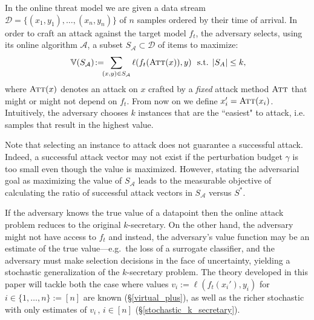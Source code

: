 In the online threat model we are given a data stream $\mathcal{D}=\{(x_1,y_1),\ldots,(x_n,y_n)\}$ of $n$ samples ordered by their time of arrival. In order to craft an attack against the target model $f_t$, the adversary selects, using its online algorithm $\mathcal{A}$, a subset $S_{\mathcal{A}} \subset \mathcal{D}$ of items to maximize: %
\begin{equation}\label{eq:asp}
   \mathbb{V}(S_\mathcal{A}) \! := \!\!\! \sum_{ (x,y) \in S_\mathcal{A}} \ell(f_{t}(\textsc{Att}(x)),y) \ \text{ s.t. } 
   |S_A| \leq k,\hspace{-1mm} 
\end{equation}
where $\textsc{Att}(x)$ denotes an attack on $x$ crafted by a \emph{fixed} attack method $\textsc{Att}$ that might or might not depend on $f_t$. From now on we define $x_i'=\textsc{Att}(x_i)$. 
Intuitively, the adversary chooses $k$ instances that are the ``easiest" to attack, i.e. samples that result in the highest value. 

Note that selecting an instance to attack does not guarantee a successful attack.
Indeed, a successful attack vector may not exist if the perturbation budget $\gamma$ is too small even though the value is maximized. However, stating the adversarial goal as maximizing the value of $S_{\mathcal{A}}$ leads to the measurable objective of calculating the ratio of successful attack vectors in $S_{\mathcal{A}}$ versus $S^*$.

If the adversary knows the true value of a datapoint then the online attack problem reduces to the original $k$-secretary. On the other hand, the adversary might not have access to $f_t$ and instead, the adversary's value function may be an estimate of the true value---e.g.\ the loss of a surrogate classifier, and the adversary must make selection decisions in the face of uncertainty, yielding a stochastic generalization of the $k$-secretary problem. The theory developed in this paper will tackle both the case where values $v_i:=\ell(f_t(x_i'),y_i)$ for $i \in \{1,\ldots,n\} :=[n]$ are known (\S\ref{virtual_plus}), as well as the richer stochastic with only estimates of $v_i\,,\, i \in [n]$ (\S\ref{stochastic_k_secretary}).

